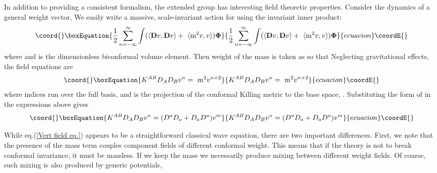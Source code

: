 \documentclass[a4paper,12pt]{article}
\begin{document}
In addition to providing a consistent formalism, the extended group has interesting field theoretic properties. Consider the dynamics of a general weight vector, \coordHE{} We easily write a massive, scale-invariant action for \coordHE{} using the invariant inner product: 
\begin{equation}\coord{}\boxEquation{
\frac{1}{2}\sum_{n=-\infty }^{\infty }\int (\langle \mathbf{D}v,\mathbf{D}
v\rangle +\ \langle \mathrm{m}^{2}v,v\rangle )\mathbf{\Phi }
}{
\frac{1}{2}\sum_{n=-\infty }^{\infty }\int (\langle \mathbf{D}v,\mathbf{D}
v\rangle +\ \langle \mathrm{m}^{2}v,v\rangle )\mathbf{\Phi }
}{ecuacion}\coordE{}\end{equation}
where \coordHE{} and \myHighlight{$\mathbf{\Phi }$}\coordHE{} is the dimensionless
biconformal volume element. Then weight of the mass is taken as \coordHE{} so
that \coordHE{}
Neglecting gravitational effects, the field equations are 
\begin{equation}\coord{}\boxEquation{
K^{AB}D_{A}D_{B}v^{n}=\ \mathrm{m}^{2}v^{n+2}  \label{Vert field eq.}
}{
K^{AB}D_{A}D_{B}v^{n}=\ \mathrm{m}^{2}v^{n+2}  }{ecuacion}\coordE{}\end{equation}
where indices \coordHE{} run over the full basis, \coordHE{} and \coordHE{} is the projection of the conformal
Killing metric to the base space, \coordHE{}. Substituting the form of \coordHE{} in the
expressions above gives 
\begin{equation}\coord{}\boxEquation{
K^{AB}D_{A}D_{B}v^{n}=(D^{a}D_{a}+D_{a}D^{a})v^{m}
}{
K^{AB}D_{A}D_{B}v^{n}=(D^{a}D_{a}+D_{a}D^{a})v^{m}
}{ecuacion}\coordE{}\end{equation}

While eq.(\ref{Vert field eq.}) appears to be a straightforward classical
wave equation, there are two important differences. First, we note that the
presence of the mass term couples component fields of different conformal
weight. This means that if the theory is not to break conformal invariance,
it must be massless. If we keep the mass we necessarily produce mixing
between different weight fields. Of course, such mixing is also produced by
generic potentials, \coordHE{}
\end{document}
